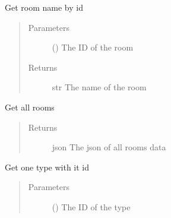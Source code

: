 \documentclass[letterpaper,10pt,english]{sphinxmanual}
\begin{document}
\begin{fulllineitems}
\begin{fulllineitems}
\begin{quote}
\begin{description}
\end{description}\end{quote}

\end{fulllineitems}


\begin{fulllineitems}
\label{\detokenize{index:Api.Api.get_room_name_by_id}}
\sphinxAtStartPar
Get room name by id
\begin{quote}\begin{description}
\item[{Parameters}] \leavevmode
\sphinxAtStartPar
{} () \textendash{} The ID of the room

\item[{Returns}] \leavevmode
\sphinxAtStartPar
str \textendash{} The name of the room

\end{description}\end{quote}

\end{fulllineitems}


\begin{fulllineitems}
\label{\detokenize{index:Api.Api.get_rooms}}
\sphinxAtStartPar
Get all rooms
\begin{quote}\begin{description}
\item[{Returns}] \leavevmode
\sphinxAtStartPar
json \textendash{} The json of all rooms data

\end{description}\end{quote}

\end{fulllineitems}


\begin{fulllineitems}
\label{\detokenize{index:Api.Api.get_type_by_id}}
\sphinxAtStartPar
Get one type with it id
\begin{quote}\begin{description}
\item[{Parameters}] \leavevmode
\sphinxAtStartPar
{} () \textendash{} The ID of the type


\end{description}
\end{quote}
\end{fulllineitems}
\end{fulllineitems}
\end{document}
